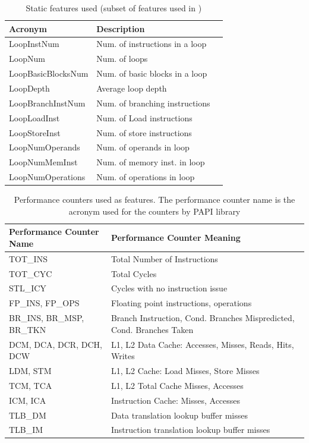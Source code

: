 \documentclass[10pt]{sigplanconf}
\begin{document}
\begin{table}[tbl2]
\caption{Static features used (subset of features used in \cite{c8})}
\begin{tabular} {lll}
\hline

\bf{Acronym} & \bf{Description} \\ \hline 
LoopInstNum & Num. of instructions in a loop \\ \hline 
LoopNum & Num. of loops \\ \hline 
LoopBasicBlocksNum & Num. of basic blocks in a loop \\ \hline 
LoopDepth & Average loop depth \\ \hline 
LoopBranchInstNum & Num. of branching instructions \\ \hline 
LoopLoadInst & Num. of Load instructions \\ \hline 
LoopStoreInst  & Num. of store instructions \\ \hline 
LoopNumOperands & Num. of operands in loop \\ \hline 
LoopNumMemInst & Num. of memory inst. in loop \\ \hline 
LoopNumOperations & Num. of operations in loop \\ \hline 

\end{tabular}
\label{tb:tbl2}
\end{table}



\begin{table}[tbl3]
  \centering
  \begin{tabular}{l|l}

\hline

\bf{Performance Counter Name} & \bf{Performance Counter Meaning} \\ \hline
TOT\_INS & Total Number of Instructions \\ \hline
TOT\_CYC & Total Cycles \\ \hline
STL\_ICY & Cycles with no instruction issue \\ \hline
FP\_INS, FP\_OPS & Floating point instructions, operations \\ \hline
BR\_INS, BR\_MSP, BR\_TKN & Branch Instruction, Cond. Branches Mispredicted, Cond. Branches Taken \\ \hline
DCM, DCA, DCR, DCH, DCW & L1, L2 Data Cache: Accesses, Misses, Reads, Hits, Writes \\ \hline
LDM, STM & L1, L2 Cache: Load Misses, Store Misses \\ \hline
TCM, TCA & L1, L2 Total Cache Misses, Accesses \\ \hline
ICM, ICA & Instruction Cache: Misses, Accesses \\ \hline
TLB\_DM & Data translation lookup buffer misses \\ \hline
TLB\_IM & Instruction translation lookup buffer misses \\ \hline


  \end{tabular}
  \caption{Performance counters used as features. The performance counter name is the acronym used for the counters by PAPI library}
  \label{tab:tbl3}
\end{table}
\end{document}
